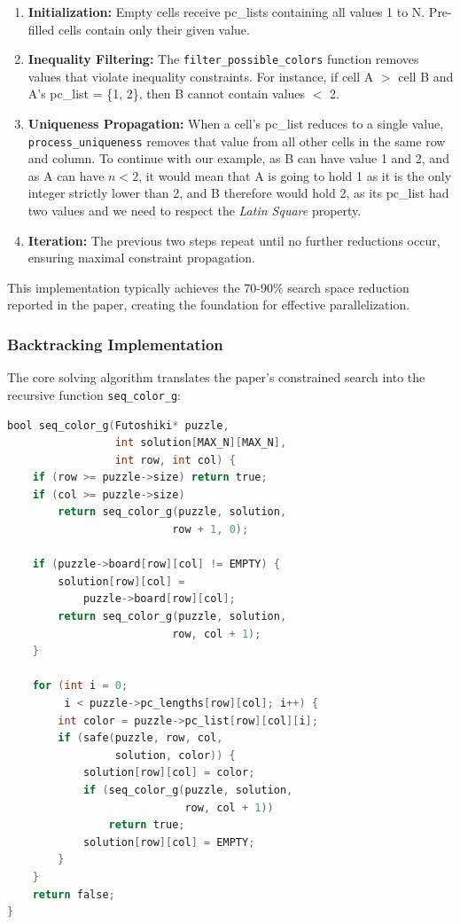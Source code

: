 \begin{enumerate}
    \item \textbf{Initialization:} Empty cells receive pc\_lists containing all values 1 to N. Pre-filled cells contain only their given value.
    
    \item \textbf{Inequality Filtering:} The \texttt{filter\_possible\_colors} function removes values that violate inequality constraints. For instance, if cell A $>$ cell B and A's pc\_list = \{1, 2\}, then B cannot contain values $<$ 2.
    
    \item \textbf{Uniqueness Propagation:} When a cell's pc\_list reduces to a single value, \texttt{process\_uniqueness} removes that value from all other cells in the same row and column. To continue with our example, as B can have value 1 and 2, and as A can have $n < 2$, it would mean that A is going to hold 1 as it is the only integer strictly lower than 2, and B therefore would hold 2, as its pc\_list had two values and we need to respect the \textit{Latin Square} property.
    
    \item \textbf{Iteration:} The previous two steps repeat until no further reductions occur, ensuring maximal constraint propagation.
\end{enumerate}

This implementation typically achieves the 70-90\% search space reduction reported in the paper, creating the foundation for effective parallelization.

\subsubsection{Backtracking Implementation}
\label{subsubsec:backtrack_with_csp}
The core solving algorithm translates the paper's constrained search into the recursive function \texttt{seq\_color\_g}:

\begin{lstlisting}[language=C, caption=Sequential backtracking implementation, label={listing:seq_implementation}]
bool seq_color_g(Futoshiki* puzzle, 
                 int solution[MAX_N][MAX_N], 
                 int row, int col) {
    if (row >= puzzle->size) return true;
    if (col >= puzzle->size) 
        return seq_color_g(puzzle, solution, 
                          row + 1, 0);
    
    if (puzzle->board[row][col] != EMPTY) {
        solution[row][col] = 
            puzzle->board[row][col];
        return seq_color_g(puzzle, solution, 
                          row, col + 1);
    }
    
    for (int i = 0; 
         i < puzzle->pc_lengths[row][col]; i++) {
        int color = puzzle->pc_list[row][col][i];
        if (safe(puzzle, row, col, 
                 solution, color)) {
            solution[row][col] = color;
            if (seq_color_g(puzzle, solution, 
                            row, col + 1))
                return true;
            solution[row][col] = EMPTY;
        }
    }
    return false;
}
\end{lstlisting}

